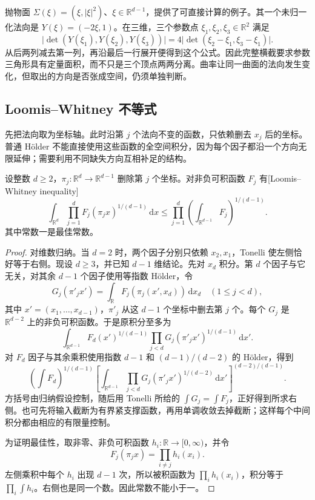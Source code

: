 抛物面 \(\Sigma(\xi)=(\xi,|\xi|^2)\)、\(\xi\in\mathbb R^{d-1}\)，提供了可直接计算的例子。其一个未归一化法向是 \(Y(\xi)=(-2\xi,1)\)。在三维，三个参数点 \(\xi_1,\xi_2,\xi_3\in\mathbb R^2\) 满足
\[
 \bigl|\det(Y(\xi_1),Y(\xi_2),Y(\xi_3))\bigr|
 =4\bigl|\det(\xi_2-\xi_1,\xi_3-\xi_1)\bigr|.
\]
从后两列减去第一列，再沿最后一行展开便得到这个公式。因此完整横截要求参数三角形具有定量面积，而不只是三个顶点两两分离。曲率让同一曲面的法向发生变化，但取出的方向是否张成空间，仍须单独判断。

\subsection{Loomis–Whitney 不等式}
\label{b2:subsec:250202}

先把法向取为坐标轴。此时沿第 \(j\) 个法向不变的函数，只依赖删去 \(x_j\) 后的坐标。普通 Hölder 不能直接使用这些函数的全空间积分，因为每个因子都沿一个方向无限延伸；需要利用不同缺失方向互相补足的结构。

\begin{theorem}\label{b2:thm:25-loomis-whitney}
设整数 \(d\geq2\)，\(\pi_j:\mathbb R^d\to\mathbb R^{d-1}\) 删除第 \(j\) 个坐标。对非负可积函数 \(F_j\) 有[Loomis--Whitney inequality]
\[
 \int_{\mathbb R^d}\prod_{j=1}^d
      F_j(\pi_jx)^{1/(d-1)}\,\mathrm dx
 \leq\prod_{j=1}^d
      \left(\int_{\mathbb R^{d-1}}F_j\right)^{1/(d-1)}.
\]
其中常数一是最佳常数。
\end{theorem}
\begin{proof}
对维数归纳。当 \(d=2\) 时，两个因子分别只依赖 \(x_2,x_1\)，Tonelli 使左侧恰好等于右侧。现设 \(d\geq3\)，并已知 \(d-1\) 维结论。先对 \(x_d\) 积分。第 \(d\) 个因子与它无关，对其余 \(d-1\) 个因子使用等指数 Hölder，令
\[
 G_j(\pi'_jx')=
 \int_{\mathbb R}F_j(\pi_j(x',x_d))\,\mathrm dx_d
 \quad(1\leq j<d),
\]
其中 \(x'=(x_1,\ldots,x_{d-1})\)，\(\pi'_j\) 从这 \(d-1\) 个坐标中删去第 \(j\) 个。每个 \(G_j\) 是 \(\mathbb R^{d-2}\) 上的非负可积函数。于是原积分至多为
\[
 \int_{\mathbb R^{d-1}}F_d(x')^{1/(d-1)}
                  \prod_{j<d}G_j(\pi'_jx')^{1/(d-1)}\,\mathrm dx'.
\]
对 \(F_d\) 因子与其余乘积使用指数 \(d-1\) 和 \((d-1)/(d-2)\) 的 Hölder，得到
\[
 \left(\int F_d\right)^{1/(d-1)}
 \left[\int_{\mathbb R^{d-1}}
       \prod_{j<d}G_j(\pi'_jx')^{1/(d-2)}\,\mathrm dx'\right]^{(d-2)/(d-1)}.
\]
方括号由归纳假设控制，随后用 Tonelli 所给的
\(\int G_j=\int F_j\)，正好得到所求右侧。也可先将输入截断为有界紧支撑函数，再用单调收敛去掉截断；这样每个中间积分都由相应的有限量控制。

为证明最佳性，取非零、非负可积函数 \(h_i:\mathbb R\to[0,\infty)\)，并令
\[
 F_j(\pi_jx)=\prod_{i\ne j}h_i(x_i).
\]
左侧乘积中每个 \(h_i\) 出现 \(d-1\) 次，所以被积函数为 \(\prod_i h_i(x_i)\)，积分等于 \(\prod_i\int h_i\)。右侧也是同一个数。因此常数不能小于一。
\end{proof}

